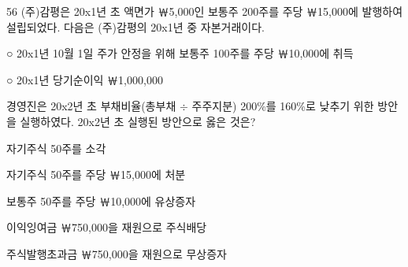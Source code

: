 \begin{question}{56}
(주)감평은 20x1년 초 액면가 ￦5,000인 보통주 200주를 주당 ￦15,000에 발행하여 설립되었다. 다음은 (주)감평의 20x1년 중 자본거래이다.
\begin{framedtext}
○ 20x1년 10월 1일 주가 안정을 위해 보통주 100주를 주당 ￦10,000에 취득 \par
○ 20x1년 당기순이익 ￦1,000,000 \par
\end{framedtext}
경영진은 20x2년 초 부채비율(총부채 $÷$ 주주지분) 200\%를 160\%로 낮추기 위한 방안을 실행하였다. 20x2년 초 실행된 방안으로 옳은 것은?
\begin{choices}
  \item 자기주식 50주를 소각
  \item 자기주식 50주를 주당 ￦15,000에 처분
  \item 보통주 50주를 주당 ￦10,000에 유상증자
  \item 이익잉여금 ￦750,000을 재원으로 주식배당
  \item 주식발행초과금 ￦750,000을 재원으로 무상증자
\end{choices}
\end{question}
